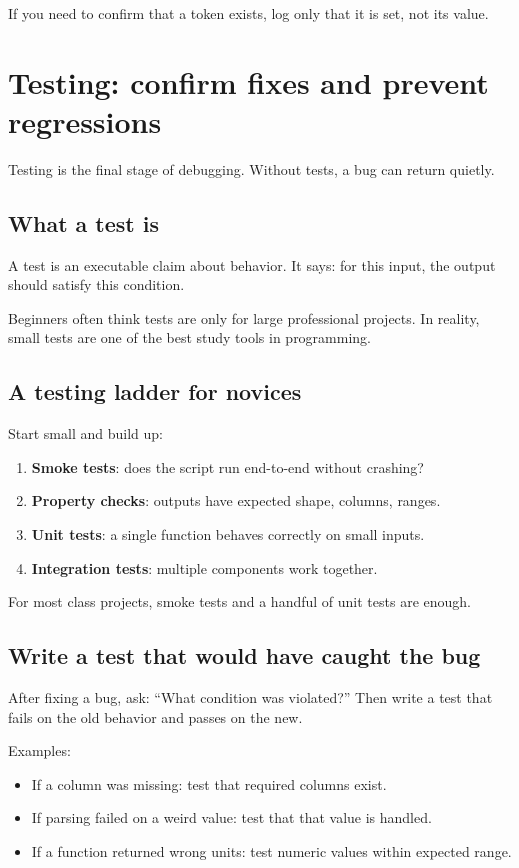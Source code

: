 If you need to confirm that a token exists, log only that it is set, not its value.

\section{Testing: confirm fixes and prevent regressions}
Testing is the final stage of debugging. Without tests, a bug can return quietly.

\subsection{What a test is}
A test is an executable claim about behavior. It says: for this input, the output should satisfy this condition.

Beginners often think tests are only for large professional projects. In reality, small tests are one of the best study tools in programming.

\subsection{A testing ladder for novices}
Start small and build up:
\begin{enumerate}[noitemsep]
  \item \textbf{Smoke tests}: does the script run end-to-end without crashing?
  \item \textbf{Property checks}: outputs have expected shape, columns, ranges.
  \item \textbf{Unit tests}: a single function behaves correctly on small inputs.
  \item \textbf{Integration tests}: multiple components work together.
\end{enumerate}

For most class projects, smoke tests and a handful of unit tests are enough.

\subsection{Write a test that would have caught the bug}
After fixing a bug, ask: ``What condition was violated?'' Then write a test that fails on the old behavior and passes on the new.

Examples:
\begin{itemize}[noitemsep]
  \item If a column was missing: test that required columns exist.
  \item If parsing failed on a weird value: test that that value is handled.
  \item If a function returned wrong units: test numeric values within expected range.
\end{itemize}

